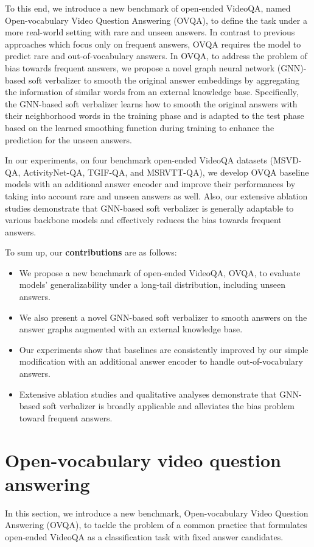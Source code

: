 \documentclass[10pt,twocolumn,letterpaper]{article}
\begin{document}
To this end, we introduce a new benchmark of open-ended VideoQA, named Open-vocabulary Video Question Answering (OVQA), to define the task under a more real-world setting with rare and unseen answers.
In contrast to previous approaches which focus only on frequent answers, OVQA requires the model to predict rare and out-of-vocabulary answers.
In OVQA, to address the problem of bias towards frequent answers, we propose a novel graph neural network (GNN)-based soft verbalizer to smooth the original answer embeddings by aggregating the information of similar words from an external knowledge base.
Specifically, the GNN-based soft verbalizer learns how to smooth the original answers with their neighborhood words in the training phase and is adapted to the test phase based on the learned smoothing function during training to enhance the prediction for the unseen answers.

In our experiments, on four benchmark open-ended VideoQA datasets (MSVD-QA, ActivityNet-QA, TGIF-QA, and MSRVTT-QA), we develop OVQA baseline models with an additional answer encoder and improve their performances by taking into account rare and unseen answers as well.
Also, our extensive ablation studies demonstrate that GNN-based soft verbalizer is generally adaptable to various backbone models and effectively reduces the bias towards frequent answers.

\noindent To sum up, our \textbf{contributions} are as follows:
\begin{itemize}
    \item[\textbullet] We propose a new benchmark of open-ended VideoQA, OVQA, to evaluate models' generalizability under a long-tail distribution, including unseen answers.
    \item[\textbullet] We also present a novel GNN-based soft verbalizer to smooth answers on the answer graphs augmented with an external knowledge base.
    \item[\textbullet] Our experiments show that baselines are consistently improved by our simple modification with an additional answer encoder to handle out-of-vocabulary answers.
    \item[\textbullet] Extensive ablation studies and qualitative analyses demonstrate that GNN-based soft verbalizer is broadly  applicable and alleviates the bias problem toward frequent answers.
\end{itemize} \section{Open-vocabulary video question answering}
In this section, we introduce a new benchmark, Open-vocabulary Video Question Answering (OVQA), to tackle the problem of a common practice that formulates open-ended VideoQA as a classification task with fixed answer candidates.
\end{document}
